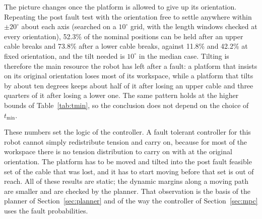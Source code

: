\documentclass[10pt]{article}
\begin{document}
The picture changes once the platform is allowed to give up its orientation. Repeating the post fault test with the orientation free to settle anywhere within $\pm20^\circ$ about each axis (searched on a $10^\circ$ grid, with the length windows checked at every orientation), 52.3\% of the nominal positions can be held after an upper cable breaks and 73.8\% after a lower cable breaks, against 11.8\% and 42.2\% at fixed orientation, and the tilt needed is $10^\circ$ in the median case. Tilting is therefore the main resource the robot has left after a fault: a platform that insists on its original orientation loses most of its workspace, while a platform that tilts by about ten degrees keeps about half of it after losing an upper cable and three quarters of it after losing a lower one. The same pattern holds at the higher bounds of Table~\ref{tab:tmin}, so the conclusion does not depend on the choice of $t_{\min}$.

These numbers set the logic of the controller. A fault tolerant controller for this robot cannot simply redistribute tension and carry on, because for most of the workspace there is no tension distribution to carry on with at the original orientation. The platform has to be moved and tilted into the post fault feasible set of the cable that was lost, and it has to start moving before that set is out of reach. All of these results are static; the dynamic margins along a moving path are smaller and are checked by the planner. That observation is the basis of the planner of Section~\ref{sec:planner} and of the way the controller of Section~\ref{sec:mpc} uses the fault probabilities.
\end{document}
